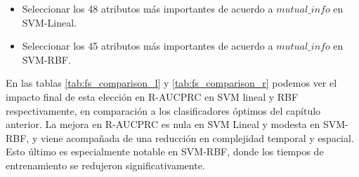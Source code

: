\begin{itemize}
\item Seleccionar los 48 atributos más importantes de acuerdo a $mutual\_info$ en SVM-Lineal.
\item Seleccionar los 45 atributos más importantes de acuerdo a $mutual\_info$ en SVM-RBF.
\end{itemize}

En las tablas \ref{tab:fs_comparison_l} y \ref{tab:fs_comparison_r} podemos ver el impacto final de esta elección en R-AUCPRC en SVM lineal y RBF respectivamente, en comparación a los clasificadores óptimos del capítulo anterior. La mejora en R-AUCPRC es nula en SVM Lineal y modesta en SVM-RBF, y viene acompañada de una reducción en complejidad temporal y espacial. Esto último es especialmente notable en SVM-RBF, donde los tiempos de entrenamiento se redujeron significativamente.
 
